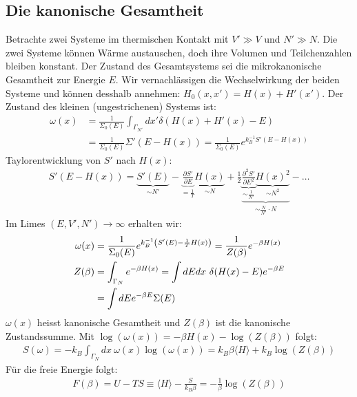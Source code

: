\subsection{Die kanonische Gesamtheit}

Betrachte zwei Systeme im thermischen Kontakt mit $V' \gg V$ und $N' \gg N$.
Die zwei Systeme können Wärme austauschen, doch ihre Volumen und Teilchenzahlen
bleiben konstant. Der Zustand des Gesamtsystems sei die mikrokanonische
Gesamtheit zur Energie $E$. Wir vernachlässigen die Wechselwirkung der beiden
Systeme und können desshalb annehmen: $H_0(x,x') = H(x) + H'(x')$.
Der Zustand des kleinen (ungestrichenen) Systems ist:
\begin{align*}
    \omega(x) &= \frac{1}{\Sigma_0 (E)} \int_{\Gamma_{N'}} dx' \delta(H(x) + H'(x) - E)
    \\
    &= \frac{1}{\Sigma_0 (E)} \Sigma'(E-H(x))
    = \frac{1}{\Sigma_0 (E)} e^{k_B^{-1} S'(E-H(x))}
\end{align*}
Taylorentwicklung von $S'$ nach $H(x)$:
\begin{align*}
    S'(E-H(x)) = \underbrace{S'(E)}_{\sim N'} - \underbrace{\frac{\partial S'}{\partial E}}_{=\frac{1}{T}}
    \underbrace{H(x)}_{\sim N} + \frac{1}{2} \underbrace{\underbrace{\frac{\partial^2 S'}{\partial E^2}}_{\sim \frac{1}{N'}}
    \underbrace{H(x)^2}_{\sim N^2}}_{\sim \frac{N}{N'} \cdot N} - \dots
\end{align*}
Im Limes $(E,V',N') \rightarrow \infty$ erhalten wir:
\begin{align*}
    \omega(x) &= \frac{1}{\Sigma_0(E)} e^{k_B^{-1} \left( S'(E) - \frac{1}{T} H(x) \right)}
    = \frac{1}{Z(\beta)} e^{-\beta H(x)}
    \\
    Z(\beta) &= \int_{\Gamma_N} e^{-\beta H(x)}
    = \int dE dx \ \delta(H(x)-E) e^{-\beta E}
    \\
    &= \int dE e^{-\beta E} \Sigma(E)
\end{align*}
$\omega(x)$ heisst kanonische Gesamtheit und $Z(\beta)$ ist die kanonische
Zustandssumme. Mit $\log(\omega(x)) = - \beta H(x) - \log(Z(\beta))$ folgt:
\begin{align*}
    S(\omega) = - k_B \int_{\Gamma_N} dx \ \omega(x) \log(\omega(x))
    = k_B \beta \langle H \rangle + k_B \log(Z(\beta))
\end{align*}
Für die freie Energie folgt:
\begin{align*}
    F(\beta) = U - T S \equiv \langle H \rangle - \frac{S}{k_B \beta}
    = - \frac{1}{\beta} \log(Z(\beta))
\end{align*}

